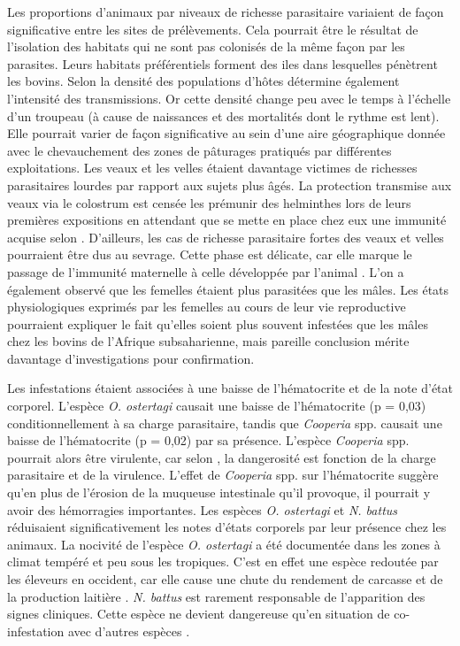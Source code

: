 \par Les proportions d’animaux par niveaux de richesse parasitaire variaient de façon significative entre les sites de prélèvements. Cela pourrait être le résultat de l’isolation des habitats qui ne sont pas colonisés de la même façon par les parasites. Leurs habitats préférentiels forment des iles dans lesquelles pénètrent les bovins. Selon  la densité des populations d’hôtes détermine également l’intensité des transmissions. Or cette densité change peu avec le temps à l’échelle d’un troupeau (à cause de naissances et des mortalités dont le rythme est lent). Elle pourrait varier de façon significative au sein d’une aire géographique donnée avec le chevauchement des zones de pâturages pratiqués par différentes exploitations. Les veaux et les velles étaient davantage victimes de richesses parasitaires lourdes par rapport aux sujets plus âgés. La protection transmise aux veaux via le colostrum est censée les prémunir des helminthes lors de leurs premières expositions en attendant que se mette en place chez eux une immunité acquise selon . D’ailleurs, les cas de richesse parasitaire fortes des veaux et velles pourraient être dus au sevrage. Cette phase est délicate, car elle marque le passage de l’immunité maternelle à celle développée par l’animal . 
L’on a également observé que les femelles étaient plus parasitées que les mâles. Les états physiologiques exprimés par les femelles au cours de leur vie reproductive pourraient expliquer le fait qu’elles soient plus souvent infestées que les mâles chez les bovins de l’Afrique subsaharienne, mais pareille conclusion mérite davantage d’investigations pour confirmation.

\par Les infestations étaient associées à une baisse de l’hématocrite et de la note d’état corporel. L’espèce \textit{O. ostertagi} causait une baisse de l’hématocrite (p = 0,03) conditionnellement à sa charge parasitaire, tandis que \textit{Cooperia} spp. causait une baisse de l’hématocrite (p = 0,02) par sa présence. L’espèce \textit{Cooperia} spp. pourrait alors être virulente, car selon , la dangerosité est fonction de la charge parasitaire et de la virulence. L’effet de \textit{Cooperia} spp. sur l’hématocrite suggère qu’en plus de l’érosion de la muqueuse intestinale qu'il provoque, il pourrait y avoir des hémorragies importantes. Les espèces \textit{O. ostertagi} et \textit{N. battus} réduisaient significativement les notes d’états corporels par leur présence chez les animaux. La nocivité de l’espèce \textit{O. ostertagi} a été documentée dans les zones à climat tempéré et peu sous les tropiques. C’est en effet une espèce redoutée par les éleveurs en occident, car elle cause une chute du rendement de carcasse et de la production laitière . \textit{N. battus} est rarement responsable de l’apparition des signes cliniques. Cette espèce ne devient dangereuse qu’en situation de co-infestation avec d’autres espèces .

